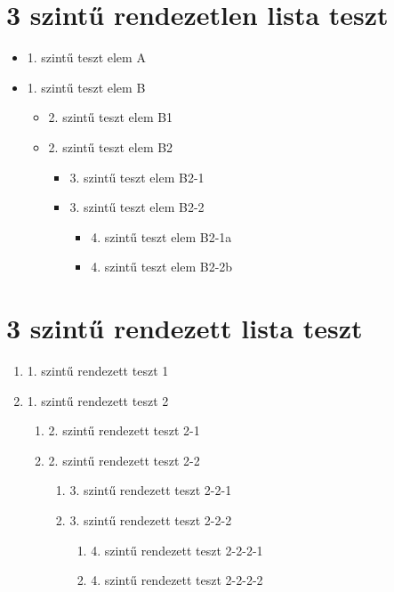 \documentclass[hu]{../../elegantbook}
\begin{document}
\section{3 szintű rendezetlen lista teszt}
\begin{itemize}
\item 1. szintű teszt elem A
\item 1. szintű teszt elem B
    \begin{itemize}
    \item 2. szintű teszt elem B1
    \item 2. szintű teszt elem B2
        \begin{itemize}
        \item 3. szintű teszt elem B2-1
        \item 3. szintű teszt elem B2-2
            \begin{itemize}
            \item 4. szintű teszt elem B2-1a
            \item 4. szintű teszt elem B2-2b
            \end{itemize}
        \end{itemize}
    \end{itemize}
\end{itemize}

\section{3 szintű rendezett lista teszt}
\begin{enumerate}
\item 1. szintű rendezett teszt 1
\item 1. szintű rendezett teszt 2
    \begin{enumerate}
    \item 2. szintű rendezett teszt 2-1
    \item 2. szintű rendezett teszt 2-2
        \begin{enumerate}
        \item 3. szintű rendezett teszt 2-2-1
        \item 3. szintű rendezett teszt 2-2-2
            \begin{enumerate}
            \item 4. szintű rendezett teszt 2-2-2-1
            \item 4. szintű rendezett teszt 2-2-2-2
            \end{enumerate}
        \end{enumerate}
    \end{enumerate}
\end{enumerate}
\end{document}
